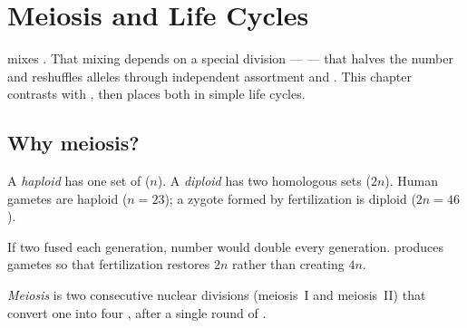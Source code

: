 \chapter{Meiosis and Life Cycles}\label{ch:g11:meiosis-life-cycles}

 mixes . That mixing depends on a special division
--- \emph{} --- that halves the  number and reshuffles alleles
through independent assortment and . This chapter contrasts 
with , then places both in simple life cycles.

\section{Why meiosis?}

\begin{definition}\label{def:g11:meiosis-life-cycles:ploidy}
A \emph{haploid}  has one set of  ($n$). A
\emph{diploid}  has two homologous sets ($2n$). Human gametes
are haploid ($n = 23$); a zygote formed by fertilization is diploid ($2n = 46$).
\end{definition}

\begin{proposition}\label{prop:g11:meiosis-life-cycles:need}
If two   fused each generation,  number would double every
generation.  produces  gametes so that fertilization restores $2n$
rather than creating $4n$.
\end{proposition}
\admitted

\begin{definition}[Meiosis]\label{def:g11:meiosis-life-cycles:meiosis}
\emph{Meiosis} is two consecutive nuclear divisions
(meiosis~I and meiosis~II) that convert one   into four 
, after a single round of .
\end{definition}

